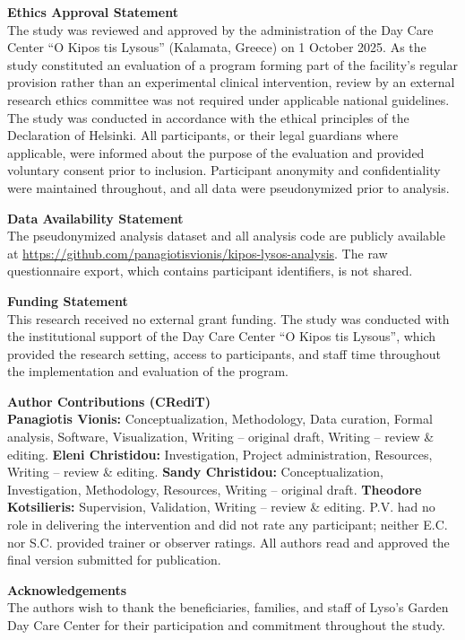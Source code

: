 \documentclass[12pt,a4paper]{article}
\begin{document}
\vspace{0.6cm}

\noindent\textbf{Ethics Approval Statement}\\
The study was reviewed and approved by the administration of the Day Care Center
``O Kipos tis Lysous'' (Kalamata, Greece) on 1 October 2025. As the study constituted
an evaluation of a program forming part of the facility's regular provision rather
than an experimental clinical intervention, review by an external research ethics
committee was not required under applicable national guidelines. The study was
conducted in accordance with the ethical principles of the Declaration of Helsinki.
All participants, or their legal guardians where applicable, were informed about the
purpose of the evaluation and provided voluntary consent prior to inclusion.
Participant anonymity and confidentiality were maintained throughout, and all data
were pseudonymized prior to analysis.

\vspace{0.6cm}

\noindent\textbf{Data Availability Statement}\\
The pseudonymized analysis dataset and all analysis code are publicly available at
\url{https://github.com/panagiotisvionis/kipos-lysos-analysis}.
The raw questionnaire export, which contains participant identifiers, is not shared.

\vspace{0.6cm}

\noindent\textbf{Funding Statement}\\
This research received no external grant funding. The study was conducted with
the institutional support of the Day Care Center ``O Kipos tis Lysous'', which provided
the research setting, access to participants, and staff time throughout the
implementation and evaluation of the program.

\vspace{0.6cm}

\noindent\textbf{Author Contributions (CRediT)}\\
\textbf{Panagiotis Vionis:} Conceptualization, Methodology, Data curation, Formal analysis, Software, Visualization, Writing -- original draft, Writing -- review \& editing. \textbf{Eleni Christidou:} Investigation, Project administration, Resources, Writing -- review \& editing. \textbf{Sandy Christidou:} Conceptualization, Investigation, Methodology, Resources, Writing -- original draft. \textbf{Theodore Kotsilieris:} Supervision, Validation, Writing -- review \& editing. P.V. had no role in delivering the intervention and did not rate any participant; neither E.C. nor S.C. provided trainer or observer ratings. All authors read and approved the final version submitted for publication.

\vspace{0.6cm}

\noindent\textbf{Acknowledgements}\\
The authors wish to thank the beneficiaries, families, and staff of Lyso's Garden
Day Care Center for their participation and commitment throughout the study.
\end{document}
